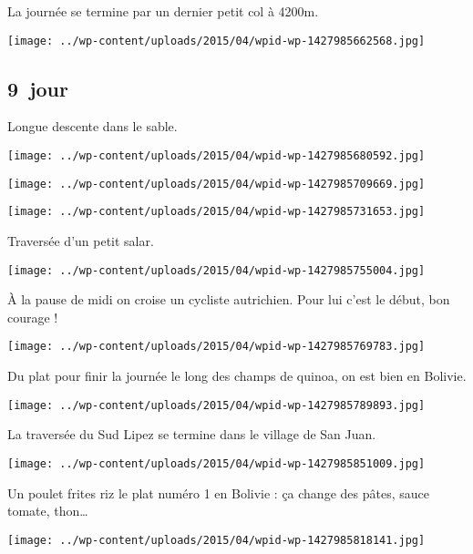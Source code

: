 \pagebreak
 La journée se termine par un dernier petit col à 4200m.
\begin{center} \texttt{[image: ../wp-content/uploads/2015/04/wpid-wp-1427985662568.jpg]} \end{center}

 \subsection*{9\ieme\ jour} 

 Longue descente dans le sable.
\begin{center} \texttt{[image: ../wp-content/uploads/2015/04/wpid-wp-1427985680592.jpg]} \end{center}
\begin{center} \texttt{[image: ../wp-content/uploads/2015/04/wpid-wp-1427985709669.jpg]} \end{center}
\begin{center} \texttt{[image: ../wp-content/uploads/2015/04/wpid-wp-1427985731653.jpg]} \end{center}

\pagebreak
 Traversée d'un petit salar.
\begin{center} \texttt{[image: ../wp-content/uploads/2015/04/wpid-wp-1427985755004.jpg]} \end{center}

 À la pause de midi on croise un cycliste autrichien. Pour lui c'est le début, bon courage !
\begin{center} \texttt{[image: ../wp-content/uploads/2015/04/wpid-wp-1427985769783.jpg]} \end{center}

\pagebreak
 Du plat pour finir la journée le long des champs de quinoa, on est bien en Bolivie.
\begin{center} \texttt{[image: ../wp-content/uploads/2015/04/wpid-wp-1427985789893.jpg]} \end{center}

 La traversée du Sud Lipez se termine dans le village de San Juan.
\begin{center} \texttt{[image: ../wp-content/uploads/2015/04/wpid-wp-1427985851009.jpg]} \end{center}

\pagebreak
 Un poulet frites riz le plat numéro 1 en Bolivie : ça change des pâtes, sauce tomate, thon…
\begin{center} \texttt{[image: ../wp-content/uploads/2015/04/wpid-wp-1427985818141.jpg]} \end{center}